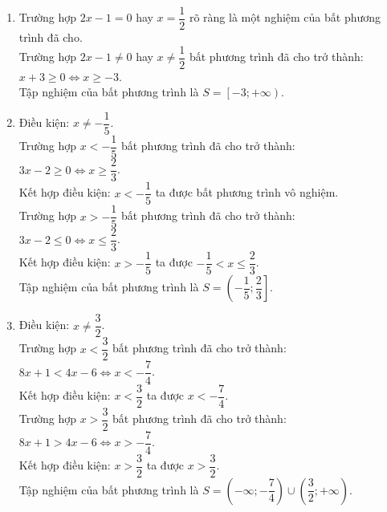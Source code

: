 \begin{bt}
{\begin{enumerate}
			\item Trường hợp $2x-1=0$ hay $x=\dfrac{1}{2}$ rõ ràng là một nghiệm của bất phương trình đã cho.\\
			Trường hợp $2x-1 \neq 0$ hay $x \ne \dfrac{1}{2}$ bất phương trình đã cho trở thành:\\
			$x+3 \geq 0 \Leftrightarrow x \geq -3$.\\
			Tập nghiệm của bất phương trình là $S=\left[-3;+\infty\right)$.
			
			\item Điều kiện: $x \ne -\dfrac{1}{5}$.\\
			Trường hợp $x < -\dfrac{1}{5}$ bất phương trình đã cho trở thành:\\
			$3x-2 \geq 0 \Leftrightarrow x \geq \dfrac{2}{3}$.\\
			Kết hợp điều kiện: $x < -\dfrac{1}{5}$ ta được bất phương trình vô nghiệm.\\
			Trường hợp $x > -\dfrac{1}{5}$ bất phương trình đã cho trở thành:\\
			$3x-2 \leq 0 \Leftrightarrow x \leq \dfrac{2}{3}$.\\
			Kết hợp điều kiện: $x > -\dfrac{1}{5}$ ta được $-\dfrac{1}{5} < x \leq \dfrac{2}{3}$.\\
			Tập nghiệm của bất phương trình là $S=\left(-\dfrac{1}{5}; \dfrac{2}{3} \right]$.
			
			\item Điều kiện: $x \ne \dfrac{3}{2}$.\\
			Trường hợp $x < \dfrac{3}{2}$ bất phương trình đã cho trở thành:\\
			$8x+1 < 4x-6 \Leftrightarrow x < -\dfrac{7}{4}$.\\
			Kết hợp điều kiện: $x < \dfrac{3}{2}$ ta được $x < -\dfrac{7}{4}$.\\
			Trường hợp $x > \dfrac{3}{2}$ bất phương trình đã cho trở thành:\\
			$8x+1 > 4x-6 \Leftrightarrow x > -\dfrac{7}{4}$.\\
			Kết hợp điều kiện: $x > \dfrac{3}{2}$ ta được $ x > \dfrac{3}{2}$.\\
			Tập nghiệm của bất phương trình là $S=\left(-\infty; -\dfrac{7}{4} \right) \cup \left(\dfrac{3}{2}; +\infty \right)$.
		\end{enumerate}
	}
\end{bt}



